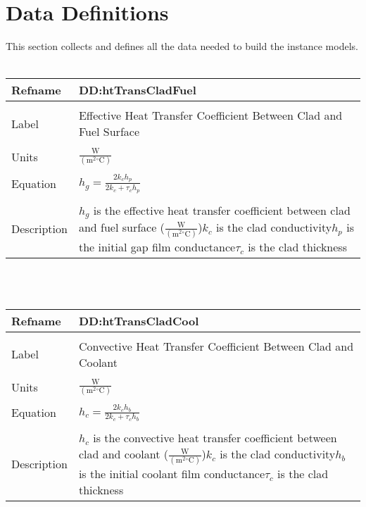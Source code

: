 \documentclass[12pt]{article}
\begin{document}
\section{Data Definitions}
\label{Sec:DDs}
This section collects and defines all the data needed to build the instance models.
~\newline
\noindent \begin{minipage}{\textwidth}
\begin{tabular}{p{} p{}}
\toprule \textbf{Refname} & \textbf{DD:htTransCladFuel}
\label{DD:htTransCladFuel}
\\ \midrule \\
Label & Effective Heat Transfer Coefficient Between Clad and Fuel Surface
\\ \midrule \\
Units & $\frac{\text{W}}{(\text{m}^{2}{}^{\circ}\text{C})}$
\\ \midrule \\
Equation & ${h_{g}}=\frac{2 {k_{c}} {h_{p}}}{2 {k_{c}}+{\tau{}_{c}} {h_{p}}}$
\\ \midrule \\
Description & ${h_{g}}$ is the effective heat transfer coefficient between clad and fuel surface ($\frac{\text{W}}{(\text{m}^{2}{}^{\circ}\text{C})}$)\newline${k_{c}}$ is the clad conductivity\newline${h_{p}}$ is the initial gap film conductance\newline${\tau{}_{c}}$ is the clad thickness
\\ \bottomrule \end{tabular}
\end{minipage}\\
~\newline
\noindent \begin{minipage}{\textwidth}
\begin{tabular}{p{} p{}}
\toprule \textbf{Refname} & \textbf{DD:htTransCladCool}
\label{DD:htTransCladCool}
\\ \midrule \\
Label & Convective Heat Transfer Coefficient Between Clad and Coolant
\\ \midrule \\
Units & $\frac{\text{W}}{(\text{m}^{2}{}^{\circ}\text{C})}$
\\ \midrule \\
Equation & ${h_{c}}=\frac{2 {k_{c}} {h_{b}}}{2 {k_{c}}+{\tau{}_{c}} {h_{b}}}$
\\ \midrule \\
Description & ${h_{c}}$ is the convective heat transfer coefficient between clad and coolant ($\frac{\text{W}}{(\text{m}^{2}{}^{\circ}\text{C})}$)\newline${k_{c}}$ is the clad conductivity\newline${h_{b}}$ is the initial coolant film conductance\newline${\tau{}_{c}}$ is the clad thickness
\\ \bottomrule \end{tabular}
\end{minipage}\\
\end{document}
